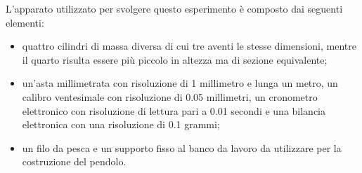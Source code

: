 L'apparato utilizzato per svolgere questo esperimento è composto dai seguenti elementi:
\begin{itemize}
	\item{quattro cilindri di massa diversa di cui tre aventi le stesse dimensioni, mentre il quarto risulta essere più piccolo in altezza ma di sezione equivalente;}
	\item{un'asta millimetrata con risoluzione di 1 millimetro e lunga un metro, un calibro ventesimale con risoluzione di 0.05 millimetri, un cronometro elettronico con risoluzione di lettura pari a 0.01 secondi e una bilancia elettronica con una risoluzione di 0.1 grammi;}
	\item{un filo da pesca e un supporto fisso al banco da lavoro da utilizzare per la costruzione del pendolo.}
\end{itemize}
